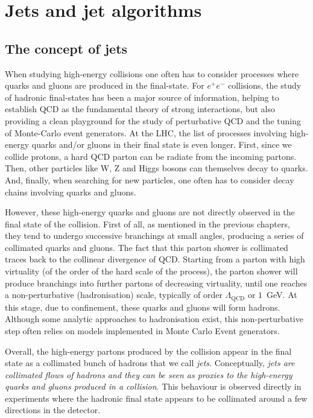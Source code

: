 %
\chapter{Jets and jet algorithms}\label{chap:jets-and-algs}

\section{The concept of jets}\label{sec:jet-concept}

When studying high-energy collisions one often has to consider
processes where quarks and gluons are produced in the final-state.
%
For $e^+e^-$ collisions, the study of hadronic final-states has been a
major source of information, helping to establish QCD as the
fundamental theory of strong interactions, but also providing a clean
playground for the study of perturbative QCD and the tuning of
Monte-Carlo event generators.
%
At the LHC, the list of processes involving high-energy quarks and/or
gluons in their final state is even longer. First, since we collide
protons, a hard QCD parton can be radiate from the incoming
partons. Then, other particles like W, Z and Higgs bosons can
themselves decay to quarks. And, finally, when searching for new
particles, one often has to consider decay chains involving quarks and
gluons.

However, these high-energy quarks and gluons are not directly observed
in the final state of the collision. First of all, as mentioned in the
previous chapters, they tend to undergo successive branchings at small
angles, producing a series of collimated quarks and gluons. The fact that this parton shower is
collimated traces back to the collinear divergence of QCD.
%
Starting from a parton with high virtuality (of the order of the hard
scale of the process), the parton shower will produce branchings into
further partons of decreasing virtuality, until one reaches a
non-perturbative (hadronisation) scale, typically of order
$\Lambda_\text{QCD}$ or $1$~GeV.
%
At this stage, due to confinement, these quarks and gluons will form
hadrons. Although some analytic approaches to hadronisation exist,
this non-perturbative step often relies on models implemented in Monte
Carlo Event generators.

Overall, the high-energy partons produced by the collision appear in
the final state as a collimated bunch of hadrons that we call {\em
  jets}.
%
Conceptually, {\it jets are collimated flows of hadrons and they can
  be seen as proxies to the high-energy quarks and gluons produced in
  a collision}.
%
This behaviour is observed directly in experiments where the hadronic
final state appears to be collimated around a few directions in the
detector.


